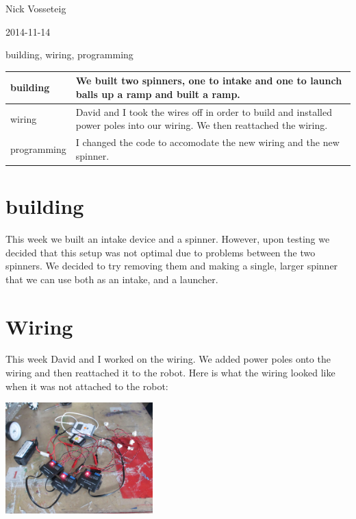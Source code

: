 Nick Vosseteig

2014-11-14

building, wiring, programming

\begin{tabular}{|p{5cm}|p{5cm}|}
 \hline
 building&
We built two spinners, one to intake and one to launch balls up a ramp and built a ramp.
 \\
 \hline
wiring&
David and I took the wires off in order to build and installed power poles into our wiring. We then reattached the wiring.
 \\
 \hline
programming&
I changed the code to accomodate the new wiring and the new spinner.
 \\
 \hline
\end{tabular}

\section*{building}
This week we built an intake device and a spinner. However, upon testing we decided that this setup was not optimal due to problems between the two spinners. We decided to try removing them and making a single, larger spinner that we can use both as an intake, and a launcher.
\section*{Wiring}
This week David and I worked on the wiring. We added power poles onto the wiring and then reattached it to the robot. Here is what the wiring looked like when it was not attached to the robot:
\begin{center}
 \includegraphics[width=215px]{./Entries/Images/detached_wiring.jpg}
\end{center}